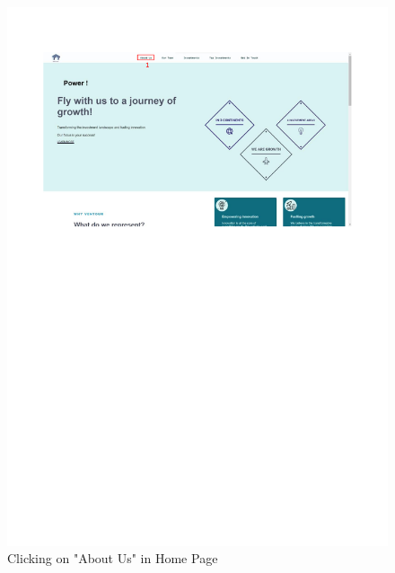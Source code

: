 \documentclass[../../DD.tex]{subfiles}
\begin{document}
            \begin{figure}[!htb]
                \centering
                \includegraphics[width=\textwidth, trim=0 450 0 0, clip]{Images/scenarios/use cases 1.pdf}
                \caption{Clicking on "About Us" in Home Page}
                \label{fig:use_cases_3_1}
            \end{figure}
\end{document}
